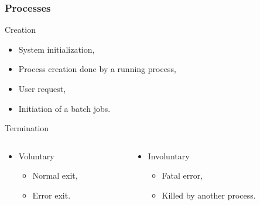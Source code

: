   \begin{frame}
    \frametitle{Processes}
        \begin{block}{Creation}
          \begin{itemize}
            \item System initialization,
            \item Process creation done by a running process,
            \item User request,
            \item Initiation of a batch jobs.
          \end{itemize}
        \end{block}

        \begin{block}{Termination}
          \begin{columns}[onlytextwidth]
            \begin{column}{0.4\textwidth}
              \begin{itemize}
                \item Voluntary
                \begin{itemize}
                  \item Normal exit,
                  \item Error exit.
                \end{itemize}
              \end{itemize}
            \end{column}
            \begin{column}{0.6\textwidth}
              \begin{itemize}
                \item Involuntary
                \begin{itemize}
                  \item Fatal error,
                  \item Killed by another process.
                \end{itemize}
              \end{itemize}
            \end{column}
          \end{columns}
        \end{block}
  \end{frame}

